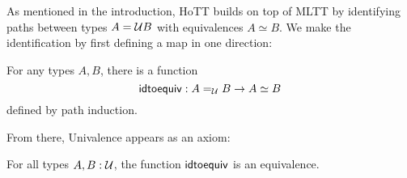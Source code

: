 \documentclass[main.tex]{subfiles}
\begin{document}
As mentioned in the introduction, HoTT builds on top of MLTT by identifying paths between types $A =\mathcal{U} B$ with equivalences $A \simeq B$. We make the identification by first defining a map in one direction:

\begin{lemma}
    For any types $A,B$, there is a function
    $$\mathsf{idtoequiv} : A =_{\mathcal{U}} B \to A \simeq B$$
    defined by path induction.
\end{lemma}

From there, Univalence appears as an axiom:

\begin{axiom}
    For all types $A,B : \mathcal{U}$, the function $\mathsf{idtoequiv}$ is an equivalence.
\end{axiom}
\end{document}
